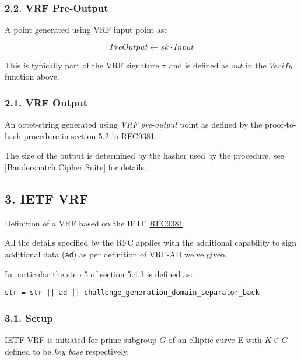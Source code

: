 \documentclass[
]{article}
\begin{document}
\hypertarget{vrf-pre-output}{%
\subsubsection{2.2. VRF Pre-Output}\label{vrf-pre-output}}

A point generated using VRF input point as:

\[PreOutput \leftarrow sk \cdot Input\]

This is typically part of the VRF signature \(\pi\) and is defined as
\(out\) in the \(Verify\) function above.

\hypertarget{vrf-output}{%
\subsubsection{2.1. VRF Output}\label{vrf-output}}

An octet-string generated using \emph{VRF pre-output} point as defined
by the proof-to-hash procedure in section 5.2 in
\href{https://datatracker.ietf.org/doc/rfc9381/}{RFC9381}.

The size of the output is determined by the hasher used by the
procedure, see {[}Bandersnatch Cipher Suite{]} for details.

\hypertarget{ietf-vrf}{%
\subsection{3. IETF VRF}\label{ietf-vrf}}

Definition of a VRF based on the IETF
\href{https://datatracker.ietf.org/doc/rfc9381/}{RFC9381}.

All the details specified by the RFC applies with the additional
capability to sign additional data (\texttt{ad}) as per definition of
VRF-AD we've given.

In particular the step 5 of section 5.4.3 is defined as:

\begin{verbatim}
str = str || ad || challenge_generation_domain_separator_back
\end{verbatim}

\hypertarget{setup}{%
\subsubsection{3.1. Setup}\label{setup}}

IETF VRF is initiated for prime subgroup \(G\) of an elliptic curve E
with \(K \in G\) defined to be \emph{key base} respectively.
\end{document}
